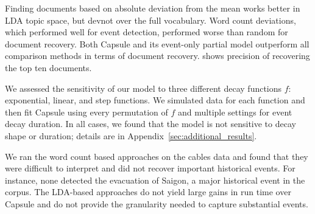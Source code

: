 Finding documents based on absolute deviation from the mean works better in LDA topic space, but devnot over the full vocabulary.  Word count deviations, which performed well for event detection, performed worse than random for document recovery.  Both Capsule and its event-only partial model outperform all comparison methods in terms of document recovery.   shows precision of recovering the top ten documents.

We assessed the sensitivity of our model to three different decay functions $f$: exponential, linear, and step functions.  We simulated data for each function and then fit Capsule using every permutation of $f$ and multiple settings for event decay duration.  In all cases, we found that the model is not sensitive to decay shape or duration; details are in Appendix~\ref{sec:additional_results}.

We ran the word count based approaches on the cables data and found that they were difficult to interpret and did not recover important historical events.  For instance, none detected the evacuation of Saigon, a major historical event in the corpus.  The LDA-based approaches do not yield large gains in run time over Capsule and do not provide the granularity needed to capture substantial events.